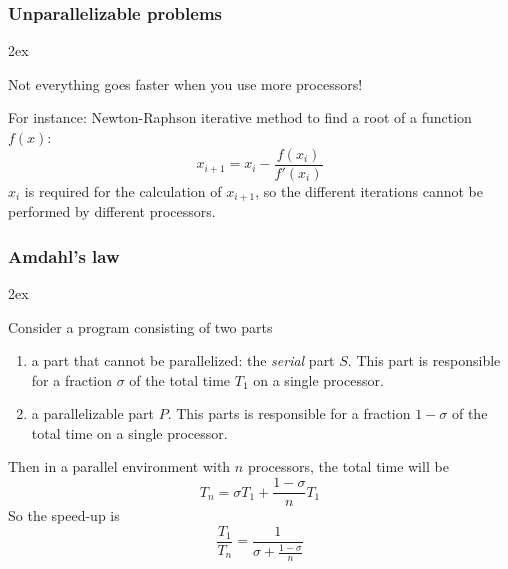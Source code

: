 \documentclass[aspectratio=149,9pt]{beamer}
\begin{document}
%
%
\begin{frame}
	\frametitle{Unparallelizable problems}
	\begin{myitemize}{2ex}
		\item Not everything goes faster when you use more processors!
		\item For instance: Newton-Raphson iterative method to find a root of a function $f(x)$:
			\begin{equation*}
				x_{i+1}=x_i-\frac{f(x_i)}{f'(x_i)}
			\end{equation*}
			$x_i$ is required for the calculation of $x_{i+1}$, so the different iterations cannot be performed by different processors.
	\end{myitemize}
\end{frame}
%
%
\begin{frame}
	\frametitle{Amdahl's law}
	\begin{myitemize}{2ex}
		\item Consider a program consisting of two parts
			\begin{enumerate}\vspace*{2ex}
				\item a part that cannot be parallelized: the \emph{serial} part $S$. This part is responsible for a fraction $\sigma$ of the total time $T_1$ on a single processor.\vspace*{2ex}
				\item a parallelizable part $P$. This parts is responsible for a fraction $1-\sigma$ of the total time on a single processor.
			\end{enumerate}
		\item Then in a parallel environment with $n$ processors, the total time will be
			\begin{equation*}
				T_n=\sigma T_1 + \frac{1-\sigma}{n} T_1
			\end{equation*}
			So the speed-up is
			\begin{equation*}
				\frac{T_1}{T_n}=\frac{1}{\sigma + \frac{1-\sigma}{n}}
			\end{equation*}
	\end{myitemize}
\end{frame}
%
%
\end{document}

